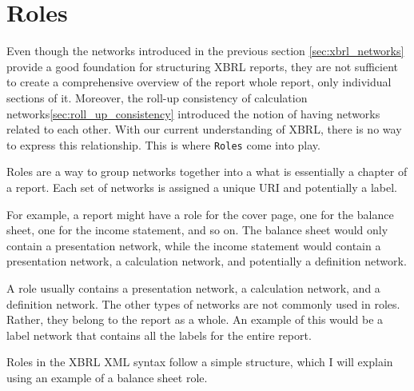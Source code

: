 \label{sec:roles}
\section{Roles}

Even though the networks introduced in the previous section \ref{sec:xbrl_networks} provide a good foundation for structuring XBRL reports, 
they are not sufficient to create a comprehensive overview of the report whole report, only individual sections of it.
Moreover, the roll-up consistency of calculation networks\ref{sec:roll_up_consistency} introduced the notion of having networks related to each other.
With our current understanding of XBRL, there is no way to express this relationship.
This is where \texttt{Roles} come into play. 

Roles are a way to group networks together into a what is essentially a chapter of a report.
Each set of networks is assigned a unique URI and potentially a label.

For example, a report might have a role for the cover page, one for the balance sheet, one for the income statement, and so on.
The balance sheet would only contain a presentation network, while the income statement would contain a presentation network, a calculation network, and potentially a definition network.

A role usually contains a presentation network, a calculation network, and a definition network.
The other types of networks are not commonly used in roles.
Rather, they belong to the report as a whole.
An example of this would be a label network that contains all the labels for the entire report.

Roles in the XBRL XML syntax follow a simple structure, which I will explain using an example of a balance sheet role.

